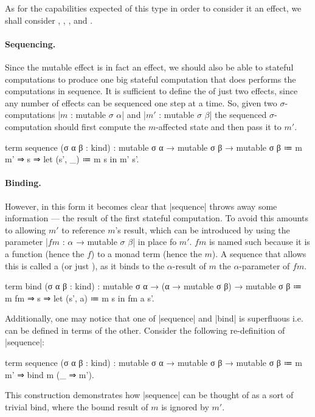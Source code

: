 \newparagraph
As for the capabilities expected of this type in order to consider it an effect, we shall consider , , , and .

\paragraph{Sequencing.}
Since the mutable effect is in fact an effect, we should also be able to  stateful computations to produce one big stateful computation that does performs the computations in sequence.
It is sufficient to define the  of just two effects, since any number of effects can be sequenced one step at a time.
So, given two $σ$-computations \code|$m$ : mutable $σ$ $α$| and \code|$m'$ : mutable $σ$ $β$| the sequenced $σ$-computation should first compute the $m$-affected state and then pass it to $m'$.

\begin{snippet}
term sequence (σ α β : kind)
  : mutable σ α → mutable σ β → mutable σ β
  ≔ m m' ⇒
      s ⇒ let (s', _) ≔ m s in m' s'.
\end{snippet}

\paragraph{Binding.}
However, in this form it becomes clear that \code|sequence| throws away some information --- the result of the first stateful computation.
To avoid this amounts to allowing $m'$ to reference $m$'s result,
which can be introduced by using the parameter \code|$fm$ : $α$ → mutable $σ$ $β$| in place fo $m'$.
$fm$ is named such because it is a function (hence the $f$) to a monad term (hence the $m$).
A sequence that allows this is called a  (or just ),
as it binds to the $α$-result of $m$ the $α$-parameter of $fm$.
\begin{snippet}
term bind (σ α β : kind)
  : mutable σ α → (α → mutable σ β) → mutable σ β
  ≔ m fm ⇒
      s ⇒ let (s', a) ≔ m s in fm a s'.
\end{snippet}
Additionally, one may notice that one of \code|sequence| and \code|bind| is superfluous i.e. can be defined in terms of the other.
Consider the following re-definition of \code|sequence|:
\begin{snippet}
term sequence (σ α β : kind)
  : mutable σ α → mutable σ β → mutable σ β
  ≔ m m' ⇒ bind m (_ ⇒ m').
\end{snippet}
This construction demonstrates how \code|sequence| can be thought of as a sort of trivial bind, where the bound result of $m$ is ignored by $m'$.

